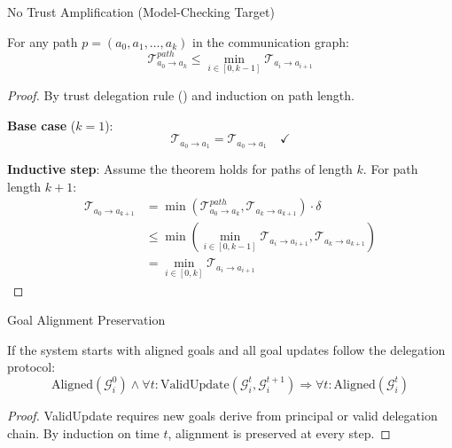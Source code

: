 \documentclass[
  ignorenonframetext,
]{beamer}
\providecommand{\cref}[1]{\texttt{\detokenize{#1}}}
\begin{document}
\begin{frame}[allowframebreaks]{No Trust Amplification (Model-Checking
Target)}
\protect{}\label{sec:trust-bound-proof}
\begin{theorem}
\label{thm:trust-bound}
For any path $p = (a_0, a_1, \ldots, a_k)$ in the communication graph:
\begin{equation}
\label{eq:trust-path-bound}
\mathcal{T}_{a_0 \to a_k}^{path} \leq \min_{i \in [0,k-1]} \mathcal{T}_{a_i \to a_{i+1}}
\end{equation}
\end{theorem}

\begin{proof}
By trust delegation rule (\cref{def:trust-delegation}) and induction on path length.

\textbf{Base case} ($k=1$):
\begin{equation}
\label{eq:trust-base}
\mathcal{T}_{a_0 \to a_1} = \mathcal{T}_{a_0 \to a_1} \quad \checkmark
\end{equation}

\textbf{Inductive step}: Assume the theorem holds for paths of length $k$. For path length $k+1$:
\begin{align}
\label{eq:trust-induction}
\mathcal{T}_{a_0 \to a_{k+1}} &= \min(\mathcal{T}_{a_0 \to a_k}^{path}, \mathcal{T}_{a_k \to a_{k+1}}) \cdot \delta \\
&\leq \min(\min_{i \in [0,k-1]} \mathcal{T}_{a_i \to a_{i+1}}, \mathcal{T}_{a_k \to a_{k+1}}) \nonumber \\
&= \min_{i \in [0,k]} \mathcal{T}_{a_i \to a_{i+1}} \nonumber
\end{align}
\end{proof}
\end{frame}

\begin{frame}[allowframebreaks]{Goal Alignment Preservation}
\protect{}\label{sec:goal-alignment-proof}
\begin{theorem}
\label{thm:goal-alignment}
If the system starts with aligned goals and all goal updates follow the delegation protocol:
\begin{equation}
\label{eq:goal-alignment-invariant}
\text{Aligned}(\mathcal{G}_i^0) \land \forall t: \text{ValidUpdate}(\mathcal{G}_i^t, \mathcal{G}_i^{t+1}) \Rightarrow \forall t: \text{Aligned}(\mathcal{G}_i^t)
\end{equation}
\end{theorem}

\begin{proof}
ValidUpdate requires new goals derive from principal or valid delegation chain. By induction on time $t$, alignment is preserved at every step.
\end{proof}
\end{frame}
\end{document}
